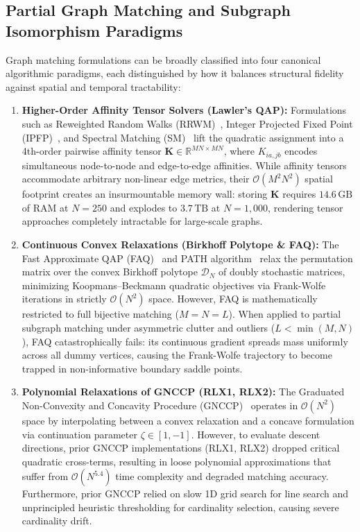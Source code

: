 \documentclass[a4paper,fleqn]{cas-dc}
\theoremstyle{thmstyleone}
\theoremstyle{thmstyletwo}
\theoremstyle{thmstylethree}
\begin{document}
\subsection{Partial Graph Matching and Subgraph Isomorphism Paradigms}
Graph matching formulations can be broadly classified into four canonical algorithmic paradigms, each distinguished by how it balances structural fidelity against spatial and temporal tractability:
\begin{enumerate}
    \item \textbf{Higher-Order Affinity Tensor Solvers (Lawler's QAP):} Formulations such as Reweighted Random Walks (RRWM)~\cite{cho2010rrwm}, Integer Projected Fixed Point (IPFP)~\cite{leordeanu2009ipfp}, and Spectral Matching (SM)~\cite{leordeanu2005} lift the quadratic assignment into a 4th-order pairwise affinity tensor $\mathbf{K} \in \mathbb{R}^{MN \times MN}$, where $K_{ia, jb}$ encodes simultaneous node-to-node and edge-to-edge affinities. While affinity tensors accommodate arbitrary non-linear edge metrics, their $\mathcal{O}(M^2 N^2)$ spatial footprint creates an insurmountable memory wall: storing $\mathbf{K}$ requires $14.6\,\text{GB}$ of RAM at $N = 250$ and explodes to $3.7\,\text{TB}$ at $N = 1{,}000$, rendering tensor approaches completely intractable for large-scale graphs.
    
    \item \textbf{Continuous Convex Relaxations (Birkhoff Polytope \& FAQ):} The Fast Approximate QAP (FAQ)~\cite{vogelstein2015fast} and PATH algorithm~\cite{zaslavskiy2009} relax the permutation matrix over the convex Birkhoff polytope $\mathcal{D}_N$ of doubly stochastic matrices, minimizing Koopmans--Beckmann quadratic objectives via Frank-Wolfe iterations in strictly $\mathcal{O}(N^2)$ space. However, FAQ is mathematically restricted to full bijective matching ($M = N = L$). When applied to partial subgraph matching under asymmetric clutter and outliers ($L < \min(M, N)$), FAQ catastrophically fails: its continuous gradient spreads mass uniformly across all dummy vertices, causing the Frank-Wolfe trajectory to become trapped in non-informative boundary saddle points.
    
    \item \textbf{Polynomial Relaxations of GNCCP (RLX1, RLX2):} The Graduated Non-Convexity and Concavity Procedure (GNCCP)~\cite{liu2015graduated, yang2018algorithm} operates in $\mathcal{O}(N^2)$ space by interpolating between a convex relaxation and a concave formulation via continuation parameter $\zeta \in [1, -1]$. However, to evaluate descent directions, prior GNCCP implementations (RLX1, RLX2) dropped critical quadratic cross-terms, resulting in loose polynomial approximations that suffer from $\mathcal{O}(N^{5.4})$ time complexity and degraded matching accuracy. Furthermore, prior GNCCP relied on slow 1D grid search for line search and unprincipled heuristic thresholding for cardinality selection, causing severe cardinality drift.
    

\end{enumerate}
\end{document}
